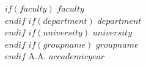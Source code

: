 {	\vspace{40mm}
	\begin{center}
		$if(faculty)$
		\textsc{$faculty$} \\
		$endif$
		$if(department)$
		\textsc{$department$} \\
		$endif$
		$if(university)$
		\textsc{$university$} \\
		$endif$
		$if(groupname)$
		\textsc{$groupname$} \\
		$endif$
		\vspace{7mm}
		\textsc{A.A. $accademicyear$}
	\end{center}

	\vfill
}



\newcommand\customtitlebackpage{
	\thispagestyle{empty}
	\hfill
	\vfill
	\textbf{$author$} ($studentnumber$) \\
	\textit{$title$} \\
	$date$ \\[12pt]
	Erstprüfer/in: $reviewer1$ \\
	Zweitprüfer/in: $reviewer2$
}
